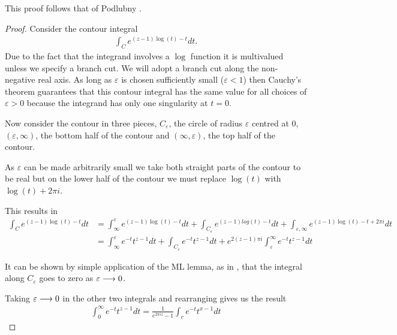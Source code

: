 This proof follows that of Podlubny \cite{Podlubny1999}.
\begin{proof}
Consider the contour integral
\begin{align}
    \int_C e^{(z-1)\log(t) - t} dt.
\end{align}
Due to the fact that the integrand involves a $ \log $ function it is multivalued unless we specify a branch
cut. We will adopt a branch cut along the non-negative real axis. As long as $ \varepsilon $ 
is chosen sufficiently small ($ \varepsilon < 1 $) then Cauchy's theorem guarantees that this contour 
integral has the same value for all choices of $ \varepsilon > 0 $ because the integrand has only one
singularity at $ t = 0 $.

Now consider the contour in three pieces, $ C_{\varepsilon} $, the circle of radius $ \varepsilon $ 
centred at 0, $ (\varepsilon, \infty) $, the bottom half of the contour and $ (\infty, \varepsilon) $, 
the top half of the contour. 

As $ \varepsilon $ can be made arbitrarily small we take both straight parts of the contour to be
real but on the lower half of the contour we must replace $ \log(t) $ with $ \log(t) + 2\pi i $. 

This results in 
\begin{align}
    \int_C e^{(z-1)\log(t)-t} dt &= \int_\infty^\varepsilon e^{(z-1)\log(t) - t} dt + \int_{C_\varepsilon} 
        e^{(z-1)log(t) - t} dt + \int_{\varepsilon, \infty} e^{(z-1)\log(t) - t + 2\pi i} dt \\
    &= \int_\infty^\varepsilon e^{-t}t^{z-1}dt + \int_{C_\varepsilon} e^{-t}t^{z-1}dt +
    e^{2(z-1)\pi i} \int_\varepsilon^\infty e^{-t}t^{z-1} dt
\end{align}


It can be shown by simple application of the ML lemma, as in \cite{Podlubny1999}, that the integral along
$ C_\varepsilon $ goes to zero as $ \varepsilon \longrightarrow 0 $.

Taking $ \varepsilon \longrightarrow 0 $ in the other two integrals and rearranging gives us the result
\begin{align}
    \label{eq:gamma_contour}
    \int_0^\infty e^{-t} t^{z-1} dt = \frac{1}{e^{2 \pi i z} - 1} \int_c e^{-t}t^{x-1} dt
\end{align}
\end{proof}

